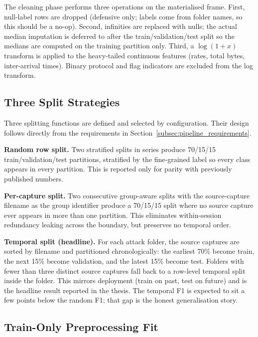 \par The cleaning phase performs three operations on the materialised frame. First, null-label rows are dropped (defensive only; labels come from folder names, so this should be a no-op). Second, infinities are replaced with nulls; the actual median imputation is deferred to after the train/validation/test split so the medians are computed on the training partition only. Third, a $\log(1+x)$ transform is applied to the heavy-tailed continuous features (rates, total bytes, inter-arrival times). Binary protocol and flag indicators are excluded from the log transform.

\subsection{Three Split Strategies}
\label{subsec:split_strategies}

\par Three splitting functions are defined and selected by configuration. Their design follows directly from the requirements in Section~\ref{subsec:pipeline_requirements}.

\par \textbf{Random row split.} Two stratified splits in series produce 70/15/15 train/validation/test partitions, stratified by the fine-grained label so every class appears in every partition. This is reported only for parity with previously published numbers.

\par \textbf{Per-capture split.} Two consecutive group-aware splits with the source-capture filename as the group identifier produce a 70/15/15 split where no source capture ever appears in more than one partition. This eliminates within-session redundancy leaking across the boundary, but preserves no temporal order.

\par \textbf{Temporal split (headline).} For each attack folder, the source captures are sorted by filename and partitioned chronologically: the earliest 70\% become train, the next 15\% become validation, and the latest 15\% become test. Folders with fewer than three distinct source captures fall back to a row-level temporal split inside the folder. This mirrors deployment (train on past, test on future) and is the headline result reported in the thesis. The temporal F1 is expected to sit a few points below the random F1; that gap is the honest generalisation story.

\subsection{Train-Only Preprocessing Fit}
\label{subsec:train_fit_preprocess}

